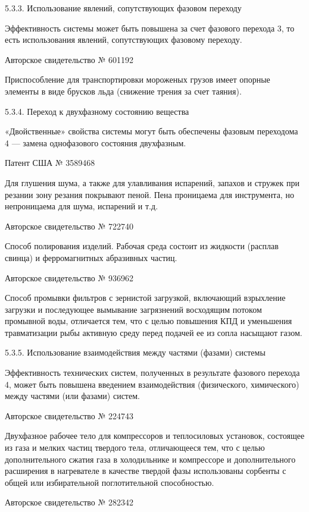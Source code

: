 5.3.3. Использование явлений, сопутствующих фазовом переходу

Эффективность системы может быть повышена за счет фазового перехода 3,
то есть использования явлений, сопутствующих фазовому переходу.

Авторское свидетельство № 601192

Приспособление  для  транспортировки  мороженых грузов  имеет  опорные
элементы в виде брусков льда (снижение трения за счет таяния).


5.3.4. Переход к двухфазному состоянию вещества

«Двойственные»   свойства  системы   могут  быть   обеспечены  фазовым
переходома 4 — замена однофазового состояния двухфазным.

Патент США № 3589468

Для  глушения  шума, а  также  для  улавливания испарений,  запахов  и
стружек при резании зону резания  покрывают пеной. Пена проницаема для
инструмента, но непроницаема для шума, испарений и т.д.

Авторское свидетельство № 722740

Способ полирования изделий. Рабочая среда состоит из жидкости (расплав
свинца) и ферромагнитных абразивных частиц.

Авторское свидетельство № 936962

Способ промывки фильтров с  зернистой загрузкой, включающий взрыхление
загрузки  и  последующее   вымывание  загрязнений  восходящим  потоком
промывной воды, отличается тем, что с целью повышения КПД и уменьшения
травматизации рыбы активную  среду перед подачей ее  из сопла насыщают
газом.

5.3.5. Использование взаимодействия
между частями (фазами) системы

Эффективность  технических систем,  полученных  в результате  фазового
перехода 4, может быть повышена введением взаимодействия (физического,
химического) между частями (или фазами) систем.

Авторское свидетельство № 224743

Двухфазное  рабочее тело  для компрессоров  и теплосиловых  установок,
состоящее из газа и мелких частиц твердого тела, отличающееся тем, что
с целью  дополнительного сжатия  газа в  холодильнике и  компрессоре и
дополнительного  расширения  в  нагревателе в  качестве  твердой  фазы
использованы  сорбенты   с  общей  или   избирательной  поглотительной
способностью.

Авторское свидетельство № 282342

